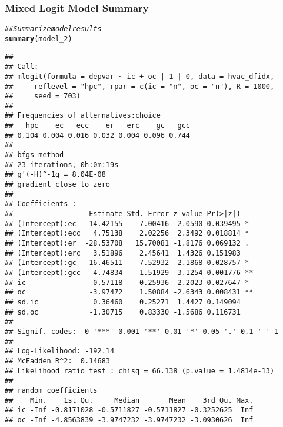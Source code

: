 \documentclass{beamer}\usepackage[]{graphicx}\usepackage[]{color}
\makeatletter
\newcommand{\hlcom}[1]{\textcolor[rgb]{0.678,0.584,0.686}{\textit{#1}}}%
\newcommand{\hlstd}[1]{\textcolor[rgb]{0.345,0.345,0.345}{#1}}%
\newcommand{\hlkwd}[1]{\textcolor[rgb]{0.737,0.353,0.396}{\textbf{#1}}}%
\newenvironment{kframe}{%
 \def\at@end@of@kframe{}%
 \ifinner\ifhmode%
  \def\at@end@of@kframe{\end{minipage}}%
  \begin{minipage}{\columnwidth}%
 \fi\fi%
 \def\FrameCommand##1{\hskip\@totalleftmargin \hskip-\fboxsep
 \colorbox{shadecolor}{##1}\hskip-\fboxsep
     \hskip-\linewidth \hskip-\@totalleftmargin \hskip\columnwidth}%
 \MakeFramed {\advance\hsize-\width
   \@totalleftmargin\z@ \linewidth\hsize
   \@setminipage}}%
 {\par\unskip\endMakeFramed%
 \at@end@of@kframe}
\newenvironment{knitrout}{}{} %
\makeatother
\begin{document}
\begin{frame}[fragile]\frametitle{Mixed Logit Model Summary}
	\vspace{1ex}
\begin{knitrout}\tiny
{}\color{fgcolor}\begin{kframe}
\begin{alltt}
\hlcom{## Summarize model results}
\hlkwd{summary}\hlstd{(model_2)}
\end{alltt}
\begin{verbatim}
## 
## Call:
## mlogit(formula = depvar ~ ic + oc | 1 | 0, data = hvac_dfidx, 
##     reflevel = "hpc", rpar = c(ic = "n", oc = "n"), R = 1000, 
##     seed = 703)
## 
## Frequencies of alternatives:choice
##   hpc    ec   ecc    er   erc    gc   gcc 
## 0.104 0.004 0.016 0.032 0.004 0.096 0.744 
## 
## bfgs method
## 23 iterations, 0h:0m:19s 
## g'(-H)^-1g = 8.04E-08 
## gradient close to zero 
## 
## Coefficients :
##                  Estimate Std. Error z-value Pr(>|z|)   
## (Intercept):ec  -14.42155    7.00416 -2.0590 0.039495 * 
## (Intercept):ecc   4.75138    2.02256  2.3492 0.018814 * 
## (Intercept):er  -28.53708   15.70081 -1.8176 0.069132 . 
## (Intercept):erc   3.51896    2.45641  1.4326 0.151983   
## (Intercept):gc  -16.46511    7.52932 -2.1868 0.028757 * 
## (Intercept):gcc   4.74834    1.51929  3.1254 0.001776 **
## ic               -0.57118    0.25936 -2.2023 0.027647 * 
## oc               -3.97472    1.50884 -2.6343 0.008431 **
## sd.ic             0.36460    0.25271  1.4427 0.149094   
## sd.oc            -1.30715    0.83330 -1.5686 0.116731   
## ---
## Signif. codes:  0 '***' 0.001 '**' 0.01 '*' 0.05 '.' 0.1 ' ' 1
## 
## Log-Likelihood: -192.14
## McFadden R^2:  0.14683 
## Likelihood ratio test : chisq = 66.138 (p.value = 1.4814e-13)
## 
## random coefficients
##    Min.    1st Qu.     Median       Mean    3rd Qu. Max.
## ic -Inf -0.8171028 -0.5711827 -0.5711827 -0.3252625  Inf
## oc -Inf -4.8563839 -3.9747232 -3.9747232 -3.0930626  Inf
\end{verbatim}
\end{kframe}
\end{knitrout}
\end{frame}
\end{document}
